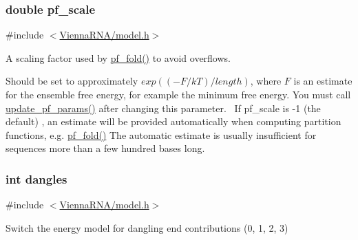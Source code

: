 \subsubsection[{\texorpdfstring{pf\+\_\+scale}{pf_scale}}]{\setlength{\rightskip}{0pt plus 5cm}double pf\+\_\+scale}\hypertarget{group__model__details_gad3b22044065acc6dee0af68931b52cfd}{}\label{group__model__details_gad3b22044065acc6dee0af68931b52cfd}


{\ttfamily \#include $<$\hyperlink{model_8h}{Vienna\+R\+N\+A/model.\+h}$>$}



A scaling factor used by \hyperlink{group__pf__fold_gadc3db3d98742427e7001a7fd36ef28c2}{pf\+\_\+fold()} to avoid overflows. 

Should be set to approximately $exp{((-F/kT)/length)}$, where $F$ is an estimate for the ensemble free energy, for example the minimum free energy. You must call \hyperlink{group__pf__fold_ga384e927890f9c034ff09fa66da102d28}{update\+\_\+pf\+\_\+params()} after changing this parameter.~\newline
If pf\+\_\+scale is -\/1 (the default) , an estimate will be provided automatically when computing partition functions, e.\+g. \hyperlink{group__pf__fold_gadc3db3d98742427e7001a7fd36ef28c2}{pf\+\_\+fold()} The automatic estimate is usually insufficient for sequences more than a few hundred bases long. 
\subsubsection[{\texorpdfstring{dangles}{dangles}}]{\setlength{\rightskip}{0pt plus 5cm}int dangles}\hypertarget{group__model__details_ga72b511ed1201f7e23ec437e468790d74}{}\label{group__model__details_ga72b511ed1201f7e23ec437e468790d74}


{\ttfamily \#include $<$\hyperlink{model_8h}{Vienna\+R\+N\+A/model.\+h}$>$}



Switch the energy model for dangling end contributions (0, 1, 2, 3) 

